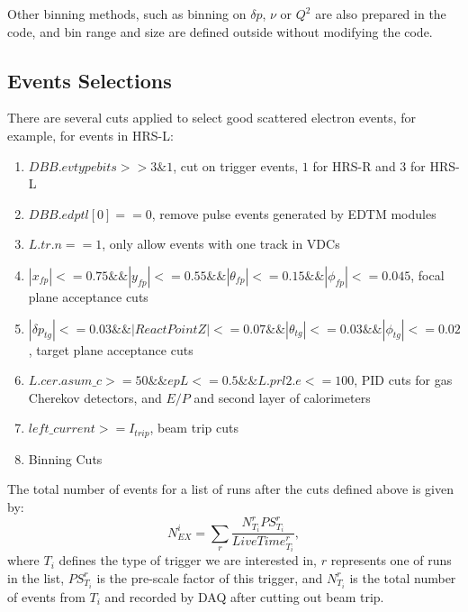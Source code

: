 \documentclass[a4paper,10.5pt]{report}
\begin{document}
 Other binning methods, such as binning on $\delta p$, $\nu$ or $Q^{2}$ are also prepared in the code, and bin range and size are defined outside without modifying the code.

\subsection{Events Selections}

There are several cuts applied to select good scattered electron events, for example, for events in HRS-L:

\begin{enumerate}
\item \textbf{$DBB.evtypebits>>3\&1$}, cut on trigger events, $1$ for HRS-R and $3$ for HRS-L\\
\item \textbf{$DBB.edptl[0]==0$}, remove pulse events generated by EDTM modules
\item \textbf{$L.tr.n==1$}, only allow events with one track in VDCs \\
\item \textbf{$|x_{fp}|<=0.75 \&\& |y_{fp}|<=0.55 \&\& |\theta_{fp}|<=0.15 \&\& |\phi_{fp}|<=0.045$}, focal plane acceptance cuts \\
\item \textbf{$|\delta p_{tg}|<=0.03 \&\& |ReactPointZ|<=0.07 \&\& |\theta_{tg}|<=0.03 \&\& |\phi_{tg}|<=0.02$}, target plane acceptance cuts \\
\item \textbf{$L.cer.asum\_c>=50 \&\& epL<=0.5 \&\& L.prl2.e<=100$}, PID cuts for gas Cherekov detectors, and $E/P$ and second layer of calorimeters \\
\item \textbf{$left\_current >= I_{trip}$}, beam trip cuts \\
\item Binning Cuts
\end{enumerate}

The total number of events for a list of runs after the cuts defined above is given by:
\begin{equation}
  N_{EX}^{i} = \sum_{r} \frac{N_{T_{i}}^{r} PS_{T_{i}}^{r}}{LiveTime_{T_{i}}^{r}},
  \label{eq_nex}
\end{equation}
where $T_{i}$ defines the type of trigger we are interested in, $r$ represents one of runs in the list, $PS_{T_{i}}^{r}$ is the pre-scale factor of this trigger, and $N_{T_{i}}^{r}$ is the total number of events from $T_{i}$ and recorded by DAQ after cutting out beam trip.
\end{document}
